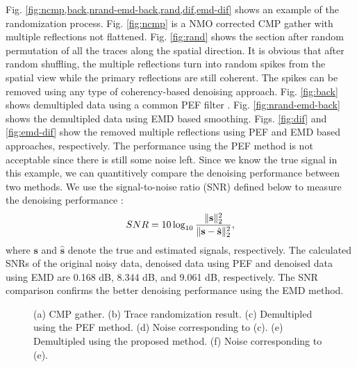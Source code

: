 Fig. \ref{fig:ncmp,back,nrand-emd-back,rand,dif,emd-dif} shows an example of the randomization process. Fig. \ref{fig:ncmp} is a NMO corrected CMP gather with multiple reflections not flattened. Fig.  \ref{fig:rand} shows the section after random permutation of all the traces along the spatial direction. It is obvious that after random shuffling, the multiple reflections turn into random spikes from the spatial view while the primary reflections are still coherent. The spikes can be removed using any type of coherency-based denoising approach. Fig. \ref{fig:back} shows demultipled data using a common PEF filter \cite{Abma1995}. Fig. \ref{fig:nrand-emd-back} shows the demultipled data using EMD based smoothing. Figs. \ref{fig:dif} and \ref{fig:emd-dif} show the removed multiple reflections using PEF and EMD based approaches, respectively. The performance using the PEF method is not acceptable since there is still some noise left. Since we know the true signal in this example, we can quantitively compare the denoising performance between two methods. We use the signal-to-noise ratio (SNR) defined below to measure the denoising performance \cite{yangkang20142,shuwei20153,weilin2016,shaohuan2016}:
\begin{equation}
\label{eq:diff}
SNR=10\log_{10}\frac{\Arrowvert \mathbf{s} \Arrowvert_2^2}{\Arrowvert \mathbf{s} -\hat{\mathbf{s}}\Arrowvert_2^2},
\end{equation}
 where $\mathbf{s}$ and $\hat{\mathbf{s}}$ denote the true and estimated signals, respectively. 
The calculated SNRs of the original noisy data, denoised data using PEF and denoised data using EMD are 0.168 dB, 8.344 dB, and 9.061 dB, respectively. The SNR comparison confirms the better denoising performance using the EMD method.


\begin{figure}[ht!]
  \centering
   \caption{(a) CMP gather. (b) Trace randomization result.  (c) Demultipled using the PEF method. (d) Noise corresponding to (c). (e) Demultipled using the proposed method.  (f) Noise corresponding to (e).}
   \label{fig:h-ncmp,h-back,h-nrand-emd-back,hrand,h-dif,h-emd-dif}
\end{figure}

